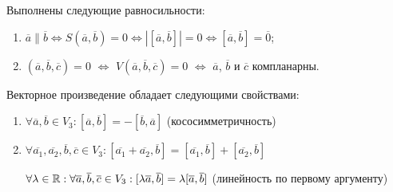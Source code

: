     \begin{note}
    	Выполнены следующие равносильности:
        \begin{enumerate}
            \item $\overline{a} \parallel \overline{b} \Leftrightarrow S(\overline{a}, \overline{b}) = 0 \Leftrightarrow |[\overline{a}, \overline{b}]| = 0 \Leftrightarrow [\overline{a}, \overline{b}] = \overline{0}$;
            \item $(\overline{a}, \overline{b}, \overline{c}) = 0$ $\Leftrightarrow$ $V(\overline{a}, \overline{b}, \overline{c}) = 0$ $\Leftrightarrow$ $\overline{a}$, $\overline{b}$ и $\overline{c}$ компланарны.
        \end{enumerate}
    \end{note}
    
    \begin{theorem}
    	Векторное произведение обладает следующими свойствами:
    	\begin{enumerate}
    		\item $\forall \overline a, \overline b \in V_3: [\overline{a}, \overline{b}] = -[\overline{b}, \overline{a}]$ (кососимметричность)
    		\item $\forall \overline{a_1}, \overline{a_2}, \overline{b}, \overline{c} \in V_3: [\overline{a_1} + \overline{a_2}, \overline{b}] = [\overline{a_1}, \overline{b}] + [\overline{a_2}, \overline{b}]$
    		
    		$\forall \lambda \in \mathbb{R}: \forall \overline{a}, \overline{b}, \overline{c} \in V_3: [\lambda\overline{a}, \overline{b}] = \lambda[\overline{a}, \overline{b}]$ (линейность по первому аргументу)
    	\end{enumerate}
    \end{theorem}
    
